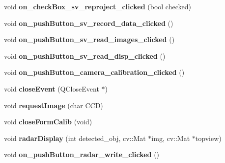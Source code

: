 \begin{DoxyCompactItemize}
\item 
\hypertarget{class_main_window_a0aae20901f69daabe680857a395110e0}{}void {\bfseries on\+\_\+check\+Box\+\_\+sv\+\_\+reproject\+\_\+clicked} (bool checked)\label{class_main_window_a0aae20901f69daabe680857a395110e0}

\item 
\hypertarget{class_main_window_a2c53b4338460d00fc3697cb8efed06d7}{}void {\bfseries on\+\_\+push\+Button\+\_\+sv\+\_\+record\+\_\+data\+\_\+clicked} ()\label{class_main_window_a2c53b4338460d00fc3697cb8efed06d7}

\item 
\hypertarget{class_main_window_a687c29593e3b6a93edf08d5d77291968}{}void {\bfseries on\+\_\+push\+Button\+\_\+sv\+\_\+read\+\_\+images\+\_\+clicked} ()\label{class_main_window_a687c29593e3b6a93edf08d5d77291968}

\item 
\hypertarget{class_main_window_a64d21d3127c3d0a9f67f393cd6e31c1c}{}void {\bfseries on\+\_\+push\+Button\+\_\+sv\+\_\+read\+\_\+disp\+\_\+clicked} ()\label{class_main_window_a64d21d3127c3d0a9f67f393cd6e31c1c}

\item 
\hypertarget{class_main_window_a7ee33b0bedeec00f1d770c15e3c5fca1}{}void {\bfseries on\+\_\+push\+Button\+\_\+camera\+\_\+calibration\+\_\+clicked} ()\label{class_main_window_a7ee33b0bedeec00f1d770c15e3c5fca1}

\item 
\hypertarget{class_main_window_a38edb88d43e844aca9d2e762c8706565}{}void {\bfseries close\+Event} (Q\+Close\+Event $\ast$)\label{class_main_window_a38edb88d43e844aca9d2e762c8706565}

\item 
\hypertarget{class_main_window_a968ecf19dc77ae5349a8939e57d53158}{}void {\bfseries request\+Image} (char C\+C\+D)\label{class_main_window_a968ecf19dc77ae5349a8939e57d53158}

\item 
\hypertarget{class_main_window_aac73d81c8d0722a100c6869bfc89a860}{}void {\bfseries close\+Form\+Calib} (void)\label{class_main_window_aac73d81c8d0722a100c6869bfc89a860}

\item 
\hypertarget{class_main_window_ab10389a1cab0e600c8e161a647b4b29d}{}void {\bfseries radar\+Display} (int detected\+\_\+obj, cv\+::\+Mat $\ast$img, cv\+::\+Mat $\ast$topview)\label{class_main_window_ab10389a1cab0e600c8e161a647b4b29d}

\item 
\hypertarget{class_main_window_ac9ea72cd1b942a15a163cb308e6fb656}{}void {\bfseries on\+\_\+push\+Button\+\_\+radar\+\_\+write\+\_\+clicked} ()\label{class_main_window_ac9ea72cd1b942a15a163cb308e6fb656}


\end{DoxyCompactItemize}
